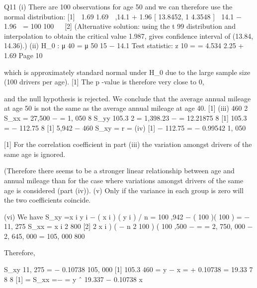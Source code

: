 \documentclass[a4paper,12pt]{article}
\begin{document}

\newpage


Q11
(i)
There are 100 observations for age 50 and we can therefore use the normal distribution:
[1]

1.69
1.69 
,14.1 + 1.96
[ 13.8452, 1 4.3548 ]
 14.1 − 1.96
 =
100
100


[2]
(Alternative solution: using the t 99 distribution and interpolation to obtain the
critical value 1.987, gives confidence interval of (13.84, 14.36).)
(ii)
H_0 : μ 40 =
μ 50
15 − 14.1
Test
statistic: z 10
=
= 4.534
2.25 + 1.69
Page 10

which is approximately standard normal under H_0 due to the large sample
size (100 drivers per age).
[1]
The p -value is therefore very close to 0,

and the null hypothesis is rejected. We conclude that the average annual
mileage at age 50 is not the same as the average annual mileage at age 40. [1]
(iii)
460 2
S_{xx} = 27,500 −
= 1, 050
8
S_{yy}
105.3 2
= 1,398.23 −
= 12.21875
8 [1]
105.3
=
− 112.75
8 [1]
5,942 − 460
S_{xy} =
r =
(iv)
[1]
− 112.75
= − 0.99542
1, 050 \; \times {}

[1]
For the correlation coefficient in part (iii) the variation amongst drivers of the
same age is ignored.

(Therefore there seems to be a stronger linear relationship between age and
annual mileage than for the case where variations amongst drivers of the same
age is considered (part (iv)).
(v) Only if the variance in each group is zero will the two coefficients coincide.

(vi) We have
S_{xy} =\sum x i y i − ( \sum x i ) ( \sum y i ) / n = 100 \; \times {},942 −
( 100 \; \times {} )( 100 \; \times {} )
= − 11, 275
S_{xx} =
\sum x i 2
800
[2]
2
\sum x i )
(
−
n
2
100 \; \times {} )
(
100 \; \times {},500 −
=
= 2, 750, 000 − 2, 645, 000 = 105, 000
800

Therefore,

S_{xy}
11, 275
= − 0.10738
105, 000 [1]
105.3
460
\hat{\alpha}= y − \hat{\beta} x =
+ 0.10738 \; \times \;
= 19.33 7
8
8 [1]
\hat{\beta} =
S_{xx}
=−
=
y ˆ 19.337 − 0.10738 x



\end{document}
